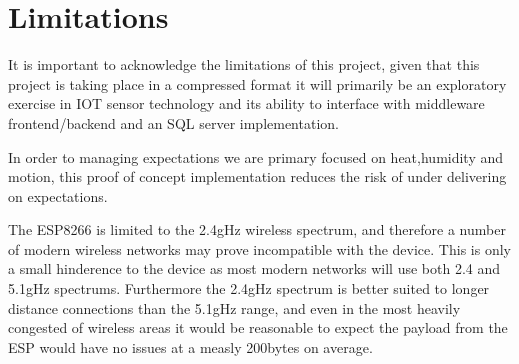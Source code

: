 \documentclass{article}
\begin{document}
    \newpage

    \section{Limitations}
        It is important to acknowledge the limitations of this project, given that this project is taking place 
        in a compressed format it will primarily be an exploratory exercise in IOT sensor technology and its 
        ability to interface with middleware frontend/backend and an SQL server implementation.
        \par
        In order to managing expectations we are primary focused on heat,humidity and motion, this proof of 
        concept implementation reduces the risk of under delivering on expectations.
        \par        
        The ESP8266 is limited to the 2.4gHz wireless spectrum, and therefore a number of modern wireless
        networks may prove incompatible with the device. This is only a small hinderence to the device as
        most modern networks will use both 2.4 and 5.1gHz spectrums. Furthermore the 2.4gHz spectrum is 
        better suited to longer distance connections than the 5.1gHz range, and even in the most
        heavily congested of wireless areas it would be reasonable to expect the payload from the ESP would
        have no issues at a measly 200bytes on average.
        \newpage
\end{document}
